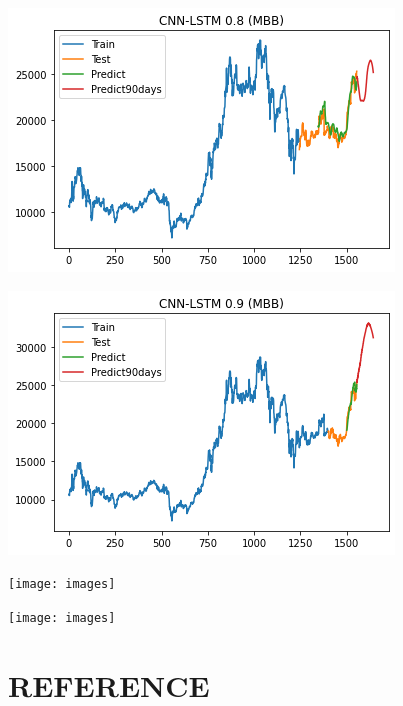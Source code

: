 \documentclass[conference]{IEEEtran}
\begin{document}
\begin{minipage}{0.23\textwidth}
    \centering
    \includegraphics[width=\linewidth]{images/CNN-LSTM/CNNLSTM_MBB_90days_82.png}
    \label{fig:image1}
\end{minipage}
\hfill
\begin{minipage}{0.23\textwidth}
    \centering
    \includegraphics[width=\linewidth]{images/CNN-LSTM/CNNLSTM_MBB_90days_91.png}
    \label{fig:image2}
\end{minipage}

\begin{minipage}{0.23\textwidth}
    \centering
    \texttt{[image: images]}
    \label{fig:image1}
\end{minipage}
\hfill
\begin{minipage}{0.23\textwidth}
    \centering
    \texttt{[image: images]}
    \label{fig:image2}
\end{minipage}







\section{REFERENCE}

\printbibliography

\vspace{12pt}
\end{document}
